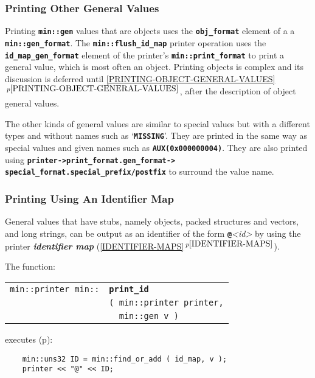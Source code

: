 \documentclass[12pt]{article}
\makeatletter
\newcommand{\TT}[1]{{\tt \bfseries #1}}
\newcommand{\key}[1]{{\bf \em #1}\index{#1}}
\newcommand{\ttindex}[1]{\index{#1@{\tt #1}}}
\newcommand{\itemref}[1]{\ref{#1}$\,^{p\pageref{#1}}$}
\newcommand{\pagref}[1]{p\pageref{#1}}
\newcommand{\EOL}{\penalty \exhyphenpenalty}
\newenvironment{indpar}[1][0.3in]%
	{\begin{list}{}%
		     {\setlength{\itemsep}{0in}%
		      \setlength{\topsep}{0in}%
		      \setlength{\parsep}{1ex}%
		      \setlength{\labelwidth}{#1}%
		      \setlength{\leftmargin}{#1}%
		      \addtolength{\leftmargin}{\labelsep}}%
	 \item}%
	{\end{list}}
\newcommand{\LABEL}[1]{\label{#1}}
\newlength{\ARGBREAKLENGTH}
\newcommand{\ARGBREAK}[1][\ARGBREAKLENGTH]{\\&\hspace*{#1}}
\newcommand{\MINKEY}[1]%
	   {\TT{#1}\ttindex{min::#1}\ttindex{#1}}
\makeatother
\begin{document}
\subsubsection{Printing Other General Values}
\label{PRINTING-OTHER-GENERAL-VALUES}

Printing \TT{min::gen} values that are objects
uses the \TT{obj\_\EOL format} element of a
a \TT{min::\EOL gen\_\EOL format}.
The \TT{min::\EOL flush\_\EOL id\_\EOL map} printer operation uses
the \TT{id\_\EOL map\_\EOL gen\_\EOL format} element of
the printer's \TT{min::\EOL print\_\EOL format}
to print a general value, which is most often an object.
Printing objects is complex and
its discussion is deferred until \itemref{PRINTING-OBJECT-GENERAL-VALUES},
after the description of object general values.

The other kinds of general values are similar to special values but
with a different types and without names such as `\TT{MISSING}'.
They are printed in the same way as special values and given
names such as \TT{AUX(0x000000004)}.  They are also printed using
\TT{printer->\EOL print\_\EOL format.gen\_\EOL format->\EOL
special\_\EOL format.special\_\EOL prefix/\EOL postfix}
to surround the value name.


\subsubsection{Printing Using An Identifier Map}
\label{PRINTING-USING-AN-IDENTIFIER-MAP}

General values that have stubs, namely objects, packed structures and vectors,
and long strings, can be
output as an identifier of the form \TT{@}{\em <id>} by using
the printer \key{identifier map} (\itemref{IDENTIFIER-MAPS}).

The function:

\begin{indpar}[1em]\begin{tabular}{r@{}l}
\verb|min::printer min::| & \MINKEY{print\_id}\ARGBREAK
    \verb|( min::printer printer,|\ARGBREAK
    \verb|  min::gen v )|
\LABEL{MIN::PRINT_ID} \\
\end{tabular}\end{indpar}

executes (\pagref{MIN::FIND_OR_ADD_OF_ID_MAP}):

\begin{indpar}\begin{verbatim}
    min::uns32 ID = min::find_or_add ( id_map, v );
    printer << "@" << ID;
\end{verbatim}\end{indpar}
\end{document}

